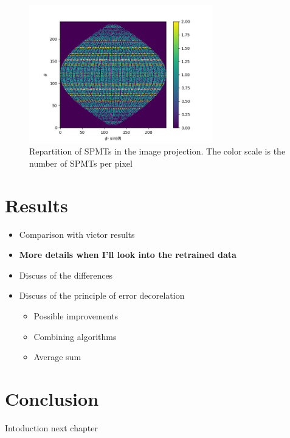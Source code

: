 
\begin{figure}[ht]
  \centering
  \includegraphics[height=6cm]{images/jcnn/pmt_repartition.png}
  \caption{Repartition of SPMTs in the image projection. The color scale is the number of SPMTs per pixel}
  \label{fig:jcnn:pmt_rep}
\end{figure}

\section{Results}

\begin{itemize}
  \item Comparison with victor results
  \item \textbf{More details when I'll look into the retrained data}
  \item Discuss of the differences
  \item Discuss of the principle of error decorelation
    \begin{itemize}
      \item Possible improvements
      \item Combining algorithms
      \item Average sum
    \end{itemize}
\end{itemize}

\section{Conclusion}
Intoduction next chapter
